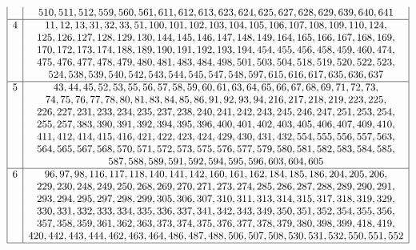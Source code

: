\documentclass{article}
\newtheorem{computational theorem}[definition]{Computational Theorem}
\begin{document}
\begin{table}[H]
\begin{center}
\begin{small}
\[\begin{array}{|*{2}{c|}}
		& 510, 511, 512, 559, 560, 561, 611, 612, 613, 623, 624, 625, 627, 628, 629, 639, 640, 641\\
		\hline
		4 & 11, 12, 13, 31, 32, 33, 51, 100, 101, 102, 103, 104, 105, 106, 107, 108, 109, 110, 124, \\
		& 125, 126, 127, 128, 129, 130, 144, 145, 146, 147, 148, 149, 164, 165, 166, 167, 168, 169, \\
		& 170, 172, 173, 174, 188, 189, 190, 191, 192, 193, 194, 454, 455, 456, 458, 459, 460, 474, \\
		& 475, 476, 477, 478, 479, 480, 481, 483, 484, 498, 501, 503, 504, 518, 519, 520, 522, 523, \\
		& 524, 538, 539, 540, 542, 543, 544, 545, 547, 548, 597, 615, 616, 617, 635, 636, 637 \\
		\hline
		5 & 43, 44, 45, 52, 53, 55, 56, 57, 58, 59, 60, 61, 63, 64, 65, 66, 67, 68, 69, 71, 72, 73, \\
		& 74, 75, 76, 77, 78, 80, 81, 83, 84, 85, 86, 91, 92, 93, 94, 216, 217, 218, 219, 223, 225, \\
		& 226, 227, 231, 233, 234, 235, 237, 238, 240, 241, 242, 243, 245, 246, 247, 251, 253, 254, \\
		& 255, 257, 383, 390, 391, 392, 394, 395, 396, 400, 401, 402, 403, 405, 406, 407, 409, 410, \\
		& 411, 412, 414, 415, 416, 421, 422, 423, 424, 429, 430, 431, 432, 554, 555, 556, 557, 563, \\ 
		& 564, 565, 567, 568, 570, 571, 572, 573, 575, 576, 577, 579, 580, 581, 582, 583, 584, 585, \\
		& 587, 588, 589, 591, 592, 594, 595, 596, 603, 604, 605 \\
		\hline
		6 & 96, 97, 98, 116, 117, 118, 140, 141, 142, 160, 161, 162, 184, 185, 186, 204, 205, 206, \\
		& 229, 230, 248, 249, 250, 268, 269, 270, 271, 273, 274, 285, 286, 287, 288, 289, 290, 291, \\
		& 293, 294, 295, 297, 298, 299, 305, 306, 307, 310, 311, 313, 314, 315, 317, 318, 319, 329, \\
		& 330, 331, 332, 333, 334, 335, 336, 337, 341, 342, 343, 349, 350, 351, 352, 354, 355, 356, \\
		& 357, 358, 359, 361, 362, 363, 373, 374, 375, 376, 377, 378, 379, 380, 398, 399, 418, 419, \\
		& 420, 442, 443, 444, 462, 463, 464, 486, 487, 488, 506, 507, 508, 530, 531, 532, 550, 551, 552 \\
		\hline
	\end{array}
	\]
\end{small}
\end{center}
\end{table}
\end{document}
